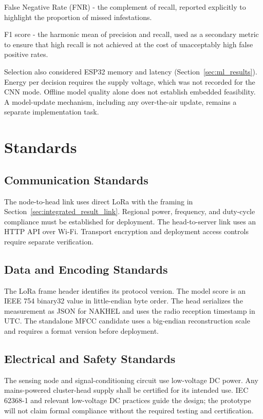 \documentclass[12pt,a4paper,oneside]{memoir}
\newcommand{\newrevision}[1]{#1}
\begin{document}
False Negative Rate (FNR) - the complement of recall, reported explicitly to highlight the proportion of missed infestations.

F1 score - the harmonic mean of precision and recall, used as a secondary metric to ensure that high recall is not achieved at the cost of unacceptably high false positive rates.

\newrevision{Selection also considered ESP32 memory and latency (Section~\ref{sec:ml_results}). Energy per decision requires the supply voltage, which was not recorded for the CNN mode. Offline model quality alone does not establish embedded feasibility. A model-update mechanism, including any over-the-air update, remains a separate implementation task.}

\section{Standards}

\subsection{Communication Standards}

\newrevision{The node-to-head link uses direct LoRa with the framing in Section~\ref{sec:integrated_result_link}. Regional power, frequency, and duty-cycle compliance must be established for deployment. The head-to-server link uses an HTTP API over Wi-Fi. Transport encryption and deployment access controls require separate verification.}


\subsection{Data and Encoding Standards}

\newrevision{The LoRa frame header identifies its protocol version. The model score is an IEEE 754 binary32 value in little-endian byte order. The head serializes the measurement as JSON for NAKHEL and uses the radio reception timestamp in UTC. The standalone MFCC candidate uses a big-endian reconstruction scale and requires a format version before deployment.}

\subsection{Electrical and Safety Standards}

\newrevision{The sensing node and signal-conditioning circuit use low-voltage DC power. Any mains-powered cluster-head supply shall be certified for its intended use. IEC 62368-1 and relevant low-voltage DC practices guide the design; the prototype will not claim formal compliance without the required testing and certification.}
\end{document}

